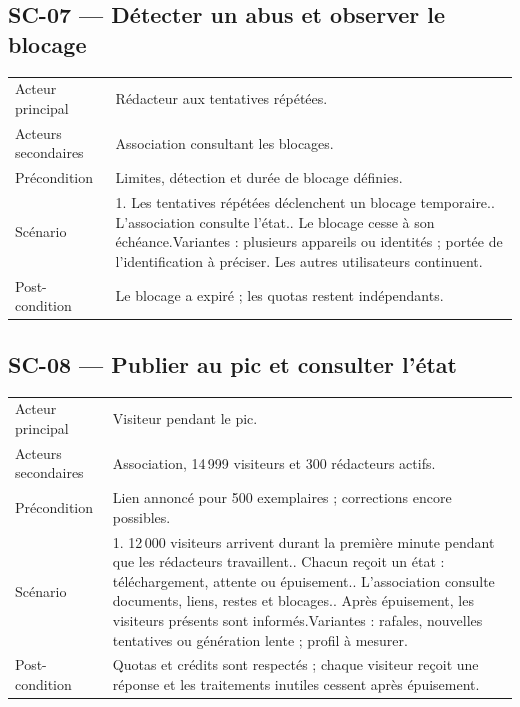 \subsection{SC-07 --- Détecter un abus et observer le blocage}
\begin{longtable}{@{}L{30mm}L{126mm}@{}}
\toprule
Acteur principal & Rédacteur aux tentatives répétées.\\
Acteurs secondaires & Association consultant les blocages.\\
Précondition & Limites, détection et durée de blocage définies.\\
Scénario & 1. Les tentatives répétées déclenchent un blocage temporaire.. L’association consulte l’état.. Le blocage cesse à son échéance.\newline Variantes : plusieurs appareils ou identités ; portée de l’identification à préciser. Les autres utilisateurs continuent.\\
Post-condition & Le blocage a expiré ; les quotas restent indépendants.\\
\bottomrule
\end{longtable}
\subsection{SC-08 --- Publier au pic et consulter l'état}
\begin{longtable}{@{}L{30mm}L{126mm}@{}}
\toprule
Acteur principal & Visiteur pendant le pic.\\
Acteurs secondaires & Association, 14\,999 visiteurs et 300 rédacteurs actifs.\\
Précondition & Lien annoncé pour 500 exemplaires ; corrections encore possibles.\\
Scénario & 1. 12\,000 visiteurs arrivent durant la première minute pendant que les rédacteurs travaillent.. Chacun reçoit un état : téléchargement, attente ou épuisement.. L’association consulte documents, liens, restes et blocages.. Après épuisement, les visiteurs présents sont informés.\newline Variantes : rafales, nouvelles tentatives ou génération lente ; profil à mesurer.\\
Post-condition & Quotas et crédits sont respectés ; chaque visiteur reçoit une réponse et les traitements inutiles cessent après épuisement.\\
\bottomrule
\end{longtable}



